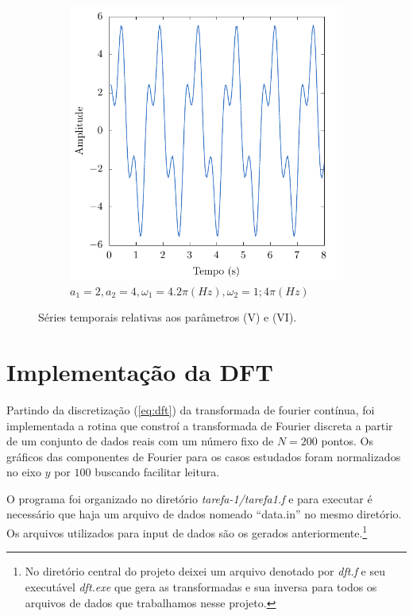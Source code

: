 \documentclass[a4paper, 11pt]{article}
\begin{document}
\begin{figure}[h!]
\begin{subfigure}{0.45\textwidth}
        \includegraphics[width=\textwidth]{signal-F}
        \caption{\(a_1 = 2, a_2 = 4, \omega_1 = 4.2\pi(Hz), \omega_2 = 1;4\pi (Hz)\)}
        \label{fig:subF}
    \end{subfigure}
    \caption{Séries temporais relativas aos parâmetros (V) e (VI).}
    \label{fig:sinais_3}
\end{figure}

\section{Implementação da DFT}

Partindo da discretização (\ref{eq:dft}) da transformada de fourier contínua, foi implementada a rotina que
constroí a transformada de Fourier discreta a partir de um conjunto de dados reais com um número
fixo de \( N = 200 \) pontos. Os gráficos das componentes de Fourier para os casos estudados foram
normalizados no eixo $y$ por $100$ buscando facilitar leitura.

O programa foi organizado no diretório \emph{tarefa-1/tarefa1.f} e para executar é necessário que
haja um arquivo de dados nomeado ``data.in'' no mesmo diretório. Os arquivos utilizados para input
de dados são os gerados anteriormente.\footnote{No diretório central do projeto deixei um arquivo
  denotado por \emph{dft.f} e seu executável \emph{dft.exe} que gera as transformadas e sua inversa
  para todos os arquivos de dados que trabalhamos nesse projeto.}
\end{document}
